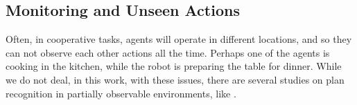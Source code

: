 \subsection{Monitoring and Unseen Actions}
Often, in cooperative tasks, agents will operate in different locations, and so they can not observe each other actions all the time. Perhaps one of the agents is cooking in the kitchen,  while the robot is preparing the table for dinner. While we do not deal, in this work, with these issues, there are several studies on plan recognition in partially observable environments, like \cite{geib2005partial}.